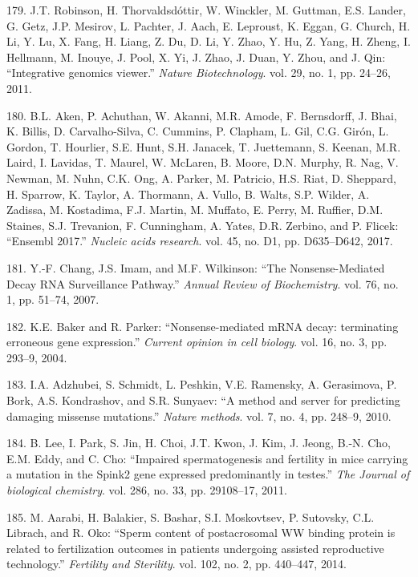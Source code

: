 \documentclass[12pt,twoside]{reedthesis}
\theoremstyle{definition}
\theoremstyle{definition}
\theoremstyle{remark}
\begin{document}
  \hypertarget{ref-Robinson2011}{}
  179. J.T. Robinson, H. Thorvaldsdóttir, W. Winckler, M. Guttman, E.S.
  Lander, G. Getz, J.P. Mesirov, L. Pachter, J. Aach, E. Leproust, K.
  Eggan, G. Church, H. Li, Y. Lu, X. Fang, H. Liang, Z. Du, D. Li, Y.
  Zhao, Y. Hu, Z. Yang, H. Zheng, I. Hellmann, M. Inouye, J. Pool, X. Yi,
  J. Zhao, J. Duan, Y. Zhou, and J. Qin: ``Integrative genomics viewer.''
  \emph{Nature Biotechnology}. vol. 29, no. 1, pp. 24--26, 2011.
  
  \hypertarget{ref-Aken2017}{}
  180. B.L. Aken, P. Achuthan, W. Akanni, M.R. Amode, F. Bernsdorff, J.
  Bhai, K. Billis, D. Carvalho-Silva, C. Cummins, P. Clapham, L. Gil, C.G.
  Girón, L. Gordon, T. Hourlier, S.E. Hunt, S.H. Janacek, T. Juettemann,
  S. Keenan, M.R. Laird, I. Lavidas, T. Maurel, W. McLaren, B. Moore, D.N.
  Murphy, R. Nag, V. Newman, M. Nuhn, C.K. Ong, A. Parker, M. Patricio,
  H.S. Riat, D. Sheppard, H. Sparrow, K. Taylor, A. Thormann, A. Vullo, B.
  Walts, S.P. Wilder, A. Zadissa, M. Kostadima, F.J. Martin, M. Muffato,
  E. Perry, M. Ruffier, D.M. Staines, S.J. Trevanion, F. Cunningham, A.
  Yates, D.R. Zerbino, and P. Flicek: ``Ensembl 2017.'' \emph{Nucleic
  acids research}. vol. 45, no. D1, pp. D635--D642, 2017.
  
  \hypertarget{ref-Chang2007}{}
  181. Y.-F. Chang, J.S. Imam, and M.F. Wilkinson: ``The Nonsense-Mediated
  Decay RNA Surveillance Pathway.'' \emph{Annual Review of Biochemistry}.
  vol. 76, no. 1, pp. 51--74, 2007.
  
  \hypertarget{ref-Baker2004}{}
  182. K.E. Baker and R. Parker: ``Nonsense-mediated mRNA decay:
  terminating erroneous gene expression.'' \emph{Current opinion in cell
  biology}. vol. 16, no. 3, pp. 293--9, 2004.
  
  \hypertarget{ref-Adzhubei2010}{}
  183. I.A. Adzhubei, S. Schmidt, L. Peshkin, V.E. Ramensky, A.
  Gerasimova, P. Bork, A.S. Kondrashov, and S.R. Sunyaev: ``A method and
  server for predicting damaging missense mutations.'' \emph{Nature
  methods}. vol. 7, no. 4, pp. 248--9, 2010.
  
  \hypertarget{ref-Lee2011}{}
  184. B. Lee, I. Park, S. Jin, H. Choi, J.T. Kwon, J. Kim, J. Jeong,
  B.-N. Cho, E.M. Eddy, and C. Cho: ``Impaired spermatogenesis and
  fertility in mice carrying a mutation in the Spink2 gene expressed
  predominantly in testes.'' \emph{The Journal of biological chemistry}.
  vol. 286, no. 33, pp. 29108--17, 2011.
  
  \hypertarget{ref-Aarabi2014}{}
  185. M. Aarabi, H. Balakier, S. Bashar, S.I. Moskovtsev, P. Sutovsky,
  C.L. Librach, and R. Oko: ``Sperm content of postacrosomal WW binding
  protein is related to fertilization outcomes in patients undergoing
  assisted reproductive technology.'' \emph{Fertility and Sterility}. vol.
  102, no. 2, pp. 440--447, 2014.
  
\end{document}
